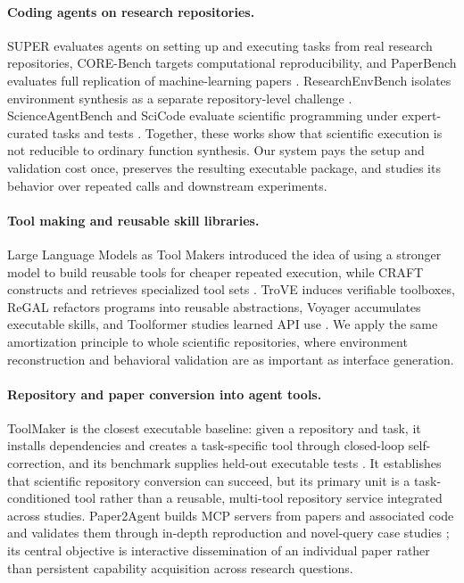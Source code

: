 \documentclass[letterpaper]{article} %
\begin{document}
\paragraph{Coding agents on research repositories.}
SUPER evaluates agents on setting up and executing tasks from real research repositories, CORE-Bench targets computational reproducibility, and PaperBench evaluates full replication of machine-learning papers \citep{bogin2024super,siegel2025corebench,starace2025paperbench}. ResearchEnvBench isolates environment synthesis as a separate repository-level challenge \citep{researchenvbench2026}. ScienceAgentBench and SciCode evaluate scientific programming under expert-curated tasks and tests \citep{chen2025scienceagentbench,tian2024scicode}. Together, these works show that scientific execution is not reducible to ordinary function synthesis. Our system pays the setup and validation cost once, preserves the resulting executable package, and studies its behavior over repeated calls and downstream experiments.

\paragraph{Tool making and reusable skill libraries.}
Large Language Models as Tool Makers introduced the idea of using a stronger model to build reusable tools for cheaper repeated execution, while CRAFT constructs and retrieves specialized tool sets \citep{cai2024latm,yuan2024craft}. TroVE induces verifiable toolboxes, ReGAL refactors programs into reusable abstractions, Voyager accumulates executable skills, and Toolformer studies learned API use \citep{trove2024,regal2024,wang2023voyager,schick2023toolformer}. We apply the same amortization principle to whole scientific repositories, where environment reconstruction and behavioral validation are as important as interface generation.

\paragraph{Repository and paper conversion into agent tools.}
ToolMaker is the closest executable baseline: given a repository and task, it installs dependencies and creates a task-specific tool through closed-loop self-correction, and its benchmark supplies held-out executable tests \citep{wolflein2025toolmaker}. It establishes that scientific repository conversion can succeed, but its primary unit is a task-conditioned tool rather than a reusable, multi-tool repository service integrated across studies. Paper2Agent builds MCP servers from papers and associated code and validates them through in-depth reproduction and novel-query case studies \citep{miao2025paper2agent}; its central objective is interactive dissemination of an individual paper rather than persistent capability acquisition across research questions.
\end{document}
